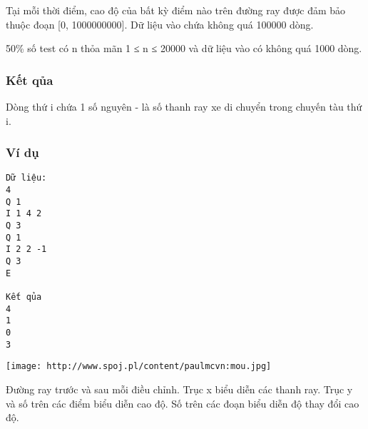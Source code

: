    Tại mỗi thời điểm, cao độ của bất kỳ điểm nào trên đường ray được đảm bảo thuộc đoạn [0, 1000000000]. Dữ liệu   vào chứa không quá 100000 dòng.  

   50\% số test có n thỏa mãn 1 ≤ n ≤ 20000 và dữ liệu vào có không quá 1000 dòng.  

\subsubsection{   Kết qủa  }

   Dòng thứ i chứa 1 số nguyên - là số thanh ray xe di chuyển trong chuyến tàu thứ i.  

\subsubsection{   Ví dụ  }
\begin{verbatim}
Dữ liệu:
4
Q 1
I 1 4 2
Q 3
Q 1
I 2 2 -1
Q 3
E

Kết qủa
4
1
0
3
\end{verbatim}


\texttt{[image: http://www.spoj.pl/content/paulmcvn:mou.jpg]}

   Đường ray trước và sau mỗi điều chỉnh. Trục x biểu diễn các thanh ray. Trục y và số trên các điểm biểu diễn cao độ.   Số trên các đoạn biểu diễn độ thay đổi cao độ.  
